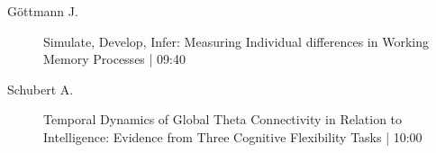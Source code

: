\begin{symposium}
\begin{description}
                \item [ Göttmann J.] Simulate, Develop, Infer: Measuring Individual differences in Working Memory Processes \textcolor{mygray}{ | 09:40}    
                
                \item [ Schubert A.] Temporal Dynamics of Global Theta Connectivity in Relation to Intelligence: Evidence from Three Cognitive Flexibility Tasks \textcolor{mygray}{ | 10:00}    
                
            \end{description} 
            \end{symposium}
            